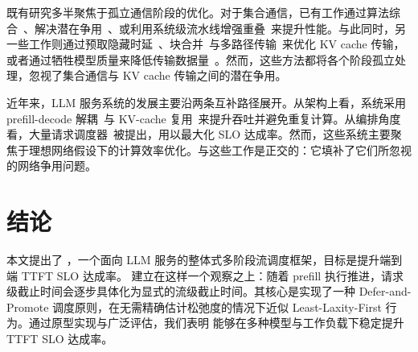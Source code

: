 既有研究多半聚焦于孤立通信阶段的优化。对于集合通信，已有工作通过算法综合~\cite{shah2023taccl,cao2025syccl}、解决潜在争用~\cite{cao2024crux,rajasekaran2024cassini}、或利用系统级流水线增强重叠~\cite{comet,zheng2025triton,hong2025flashoverlap}来提升性能。与此同时，另一些工作则通过预取隐藏时延~\cite{mooncakefast,splitwise}、块合并~\cite{li2025flowkv,chen2024kvdirect}与多路径传输~\cite{wu2026dualpath}来优化 KV cache 传输，或者通过牺牲模型质量来降低传输数据量~\cite{cachegen}。然而，这些方法都将各个阶段孤立处理，忽视了集合通信与 KV cache 传输之间的潜在争用。

 近年来，LLM 服务系统的发展主要沿两条互补路径展开。从架构上看，系统采用 prefill-decode 解耦~\cite{distserve,splitwise}与 KV-cache 复用~\cite{mooncakefast,cachedattention}来提升吞吐并避免重复计算。从编排角度看，大量请求调度器~\cite{thunderserve,stojkovic2025dynamollm,chen2025slos,hongsola,tempo2025}被提出，用以最大化 SLO 达成率。然而，这些系统主要聚焦于理想网络假设下的计算效率优化。\sys 与这些工作是正交的：它填补了它们所忽视的网络争用问题。

\section{结论}
本文提出了 \sys{}，一个面向 LLM 服务的整体式多阶段流调度框架，目标是提升端到端 TTFT SLO 达成率。\sys{} 建立在这样一个观察之上：随着 prefill 执行推进，请求级截止时间会逐步具体化为显式的流级截止时间。其核心是实现了一种 Defer-and-Promote 调度原则，在无需精确估计松弛度的情况下近似 Least-Laxity-First 行为。通过原型实现与广泛评估，我们表明 \sys{} 能够在多种模型与工作负载下稳定提升 TTFT SLO 达成率。
